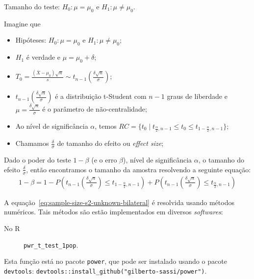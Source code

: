 \documentclass[8pt]{beamer}
\begin{document}
\begin{frame}{Tamanho do teste: $H_0:\mu = \mu_0$ e $H_1: \mu \neq \mu_0$.}

\small

Imagine que
\begin{itemize}
	\item Hipóteses: $H_0: \mu = \mu_0$ e $H_1: \mu \neq \mu_0$;
	\item $H_1$ é verdade e $\mu = \mu_0 + \delta$;
	\item $T_0 = \frac{(\bar{X} - \mu_0)\sqrt{n}}{s}  \sim t_{n-1}\left( \frac{\delta \sqrt{n}}{\sigma} \right)$;
	\item $t_{n-1}\left(\frac{\delta\sqrt{n}}{\sigma}\right)$ é a distribuição t-Student com $n-1$ graus de liberdade e $\mu=\frac{\delta \sqrt{n}}{\sigma}$ é o parâmetro de não-centralidade;
	\item Ao nível de significância $\alpha$, temos $RC = \{ t_0 \mid t_{\frac{\alpha}{2}, n-1} \leq t_0 \leq t_{1-\frac{\alpha}{2}, n-1}   \}$;
	\item Chamamos $\frac{\delta}{\sigma}$ de tamanho do efeito ou \textit{effect size};
\end{itemize}
\vfill

Dado o poder do teste $1-\beta$ (e o erro $\beta$), nível de significância $\alpha$, o tamanho do efeito $\frac{\delta}{\sigma}$, então encontramos o tamanho da amostra resolvendo a seguinte equação:
\begin{align}\label{eq:sample-size-s2-unknown-bilateral}
	1-\beta =1- P\left( t_{n-1}\left(\frac{\delta \sqrt{n}}{\sigma}\right) \leq t_{1-\frac{\alpha}{2}, n-1}  \right) + P\left( t_{n-1}\left(\frac{\delta \sqrt{n}}{\sigma}\right) \leq t_{\frac{\alpha}{2}, n-1}  \right)
\end{align}

A equação~\eqref{eq:sample-size-s2-unknown-bilateral} é resolvida usando métodos numéricos. Tais métodos são estão implementados em diversos \textit{softwares}:
\begin{description}
	\item[No R] \lstinline|pwr_t_test_1pop|.
\end{description}

Esta função está no pacote \lstinline|power|, que pode ser instalado usando o pacote \lstinline|devtools|: \lstinline|devtools::install_github("gilberto-sassi/power")|.

\normalsize

\end{frame}
\end{document}
